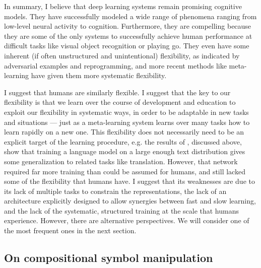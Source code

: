 In summary, I believe that deep learning systems remain promising cognitive models. They have successfully modeled a wide range of phenomena ranging from low-level neural activity to cognition. Furthermore, they are compelling because they are some of the only systems to successfully achieve human performance at difficult tasks like visual object recognition or playing go. They even have some inherent (if often unstructured and unintentional) flexibility, as indicated by adversarial examples and reprogramming, and more recent methods like meta-learning have given them more systematic flexibility. \par
I suggest that humans are similarly flexible. I suggest that the key to our flexibility is that we learn over the course of development and education to exploit our flexibility in systematic ways, in order to be adaptable in new tasks and situations --- just as a meta-learning system learns over many tasks how to learn rapidly on a new one. This flexibility does not necessarily need to be an explicit target of the learning procedure, e.g. the results of \citet{Radford2019}, discussed above, show that training a language model on a large enough text distribution gives some generalization to related tasks like translation. However, that network required far more training than could be assumed for humans, and still lacked some of the flexibility that humans have. I suggest that its weaknesses are due to its lack of multiple tasks to constrain the representations, the lack of an architecture explicitly designed to allow synergies between fast and slow learning, and the lack of the systematic, structured training at the scale that humans experience. However, there are alternative perspectives. We will consider one of the most frequent ones in the next section. \par 

\subsection{On compositional symbol manipulation} \label{sec:introduction:on_compositional}

